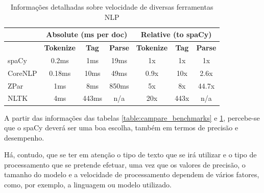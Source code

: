 \documentclass[12pt]{article}
\begin{document}
\begin{table}[!ht]
	\centering
	\renewcommand{\arraystretch}{1.3}
	\begin{tabular}{l|c|c|c|c|c|c|}
	\cline{2-7}
	& \multicolumn{3}{c|}{\cellcolor[HTML]{C0C0C0}\textbf{Absolute (ms per doc)}} & \multicolumn{3}{c|}{\cellcolor[HTML]{C0C0C0}\textbf{Relative (to spaCy)}} \\ \hline
	\rowcolor[HTML]{C0C0C0} 
	\multicolumn{1}{|c|}{\cellcolor[HTML]{C0C0C0}\textbf{System}} & \textbf{Tokenize}      & \textbf{Tag}      & \textbf{Parse}     & \textbf{Tokenize}     & \textbf{Tag}     & \textbf{Parse}     \\ \hline
	\multicolumn{1}{|l|}{\cellcolor[HTML]{C0C0C0}spaCy}
	& 0.2ms   & 1ms    & 19ms    & 1x     & 1x    & 1x     \\ \hline
	\multicolumn{1}{|l|}{\cellcolor[HTML]{C0C0C0}CoreNLP}
	& 0.18ms  & 10ms   & 49ms    & 0.9x   & 10x   & 2.6x   \\ \hline
	\multicolumn{1}{|l|}{\cellcolor[HTML]{C0C0C0}ZPar}
	& 1ms     & 8ms    & 850ms   & 5x     & 8x    & 44.7x  \\ \hline
	\multicolumn{1}{|l|}{\cellcolor[HTML]{C0C0C0}NLTK}
	& 4ms     & 443ms  & n/a     & 20x    & 443x  & n/a    \\ \hline
	\end{tabular}
	\caption{Informações detalhadas sobre velocidade de diversas ferramentas NLP}
	\label{table:campare_speed}
\end{table}

A partir das informações das tabelas \ref{table:campare_benchmarks} e \ref{table:campare_speed}, percebe-se que o spaCy deverá ser uma boa escolha, também em termos de precisão e desempenho.

Há, contudo, que se ter em atenção o tipo de texto que se irá utilizar e o tipo de processamento que se pretende efetuar, uma vez que os valores de precisão, o tamanho do modelo e a velocidade de processamento dependem de vários fatores, como, por exemplo, a linguagem ou modelo utilizado.






\end{document}
